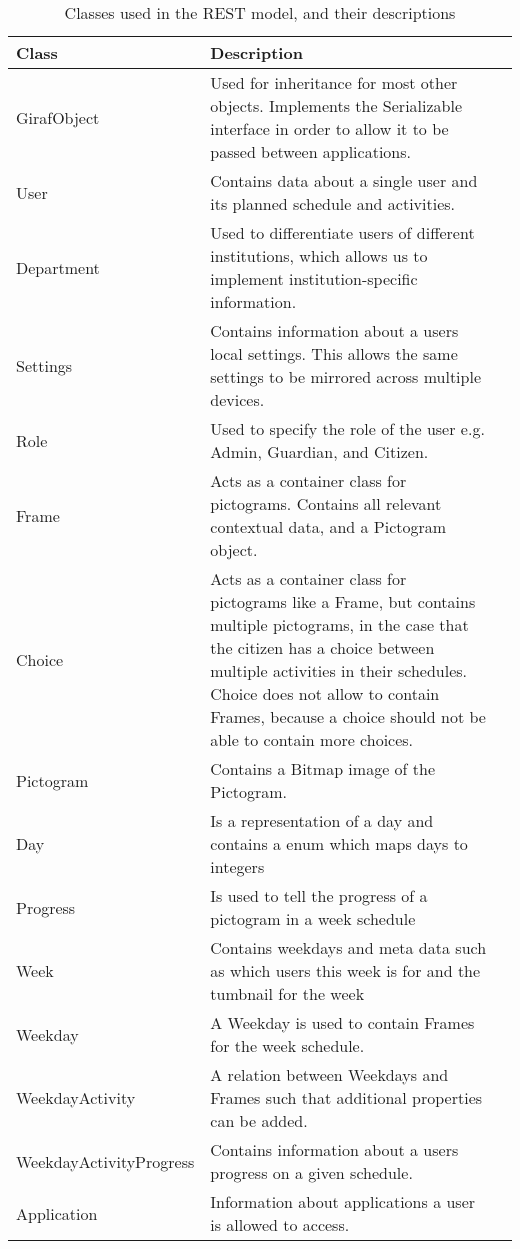\begin{table}[H] 
\begin{centering}
\begin{tabular}{|l|p{9cm}|l|}
\hline 
Class 					&	Description	\\ \hline
GirafObject				&	Used for inheritance for most other objects. Implements the
Serializable interface in order to allow it to be passed between applications. \\\hline 
User					&	Contains data about a single user and its planned
schedule and activities.\\\hline 
Department  			&	Used to differentiate users of
different institutions, which allows us to implement institution-specific information.\\\hline 
Settings    			&	Contains information about a users local settings. This allows
the same settings to be mirrored across multiple devices. \\\hline 
Role  			&	Used to specify the role of the user e.g. Admin,
Guardian, and Citizen.\\\hline 
Frame              		&   Acts as a container class for pictograms. Contains all
relevant contextual data, and a Pictogram object.\\\hline 
Choice              	&	Acts as a container class for pictograms like a Frame,
but contains multiple pictograms, in the case that the citizen has a choice between
multiple activities in their schedules. Choice does not allow to contain
Frames, because a choice should not be able to contain more choices.\\\hline
Pictogram & Contains a Bitmap image of the Pictogram.
\\\hline Day 					& 	Is a representation of a day and contains a enum which maps days
to integers \\\hline 
Progress 				& 	Is used to tell the progress of a pictogram in a week schedule
\\\hline 
Week 					& 	Contains weekdays and meta data such as which users this
week is for and the tumbnail for the week \\\hline 
Weekday              	&	A
Weekday is used to contain Frames for the week schedule.                  \\ \hline 
WeekdayActivity			& A relation between Weekdays and Frames such that additional
properties can be added.\\\hline 
WeekdayActivityProgress & 	Contains information about a users progress on a
given schedule.\\\hline 
Application    			&	Information about applications a user is allowed to access.\\\hline     
\end{tabular}
\caption{Classes used in the REST model, and their descriptions}\label{restModelTableEh}
\end{centering}
\end{table}

